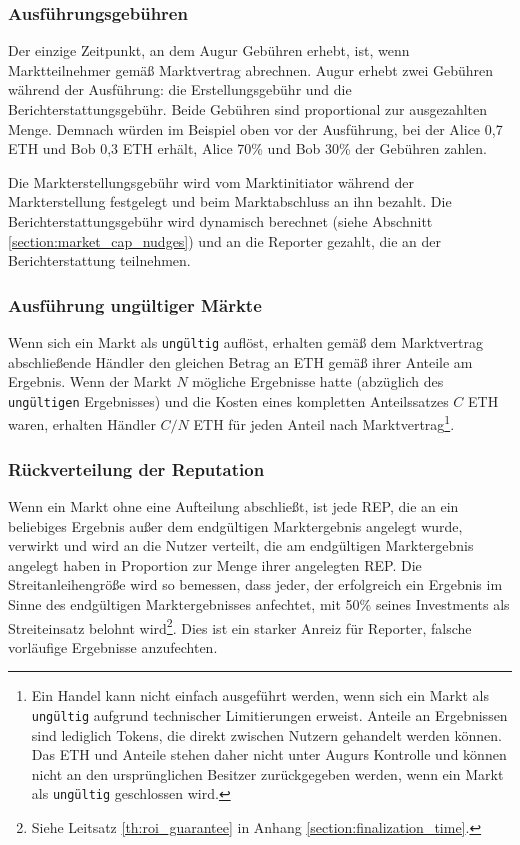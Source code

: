 \documentclass[floatfix,reprint,nofootinbib,amsmath,amssymb,epsfig,pre,floats,letterpaper,groupedaffiliation]{revtex4-1}
\theoremstyle{definition}
\theoremstyle{definition}
\theoremstyle{definition}
\begin{document}
\subsubsection{Ausführungsgebühren}

Der einzige Zeitpunkt, an dem Augur Gebühren erhebt, ist, wenn Marktteilnehmer gemäß Marktvertrag abrechnen. Augur erhebt zwei Gebühren während der Ausführung: die Erstellungsgebühr und die Berichterstattungsgebühr. Beide Gebühren sind proportional zur ausgezahlten Menge. Demnach würden im Beispiel oben vor der Ausführung, bei der Alice 0,7 ETH und Bob 0,3 ETH erhält, Alice 70\% und Bob 30\% der Gebühren zahlen.

Die Markterstellungsgebühr wird vom Marktinitiator während der Markterstellung festgelegt und beim Marktabschluss an ihn bezahlt. Die Berichterstattungsgebühr wird dynamisch berechnet (siehe Abschnitt \ref{section:market_cap_nudges}) und an die Reporter gezahlt, die an der Berichterstattung teilnehmen.

\subsubsection{Ausführung ungültiger Märkte}\label{section:settlement_of_invalid_markets}

Wenn sich ein Markt als \texttt{ungültig} auflöst, erhalten gemäß dem Marktvertrag abschließende Händler den gleichen Betrag an ETH gemäß ihrer Anteile am Ergebnis. Wenn der Markt $N$ mögliche Ergebnisse hatte (abzüglich des \texttt{ungültigen} Ergebnisses) und die Kosten eines kompletten Anteilssatzes $C$ ETH waren, erhalten Händler $C/N$ ETH für jeden Anteil nach Marktvertrag\footnote{Ein Handel kann nicht einfach ausgeführt werden, wenn sich ein Markt als \texttt{ungültig} aufgrund technischer Limitierungen erweist. Anteile an Ergebnissen sind lediglich Tokens, die direkt zwischen Nutzern gehandelt werden können. Das ETH und Anteile stehen daher nicht unter Augurs Kontrolle und können nicht an den ursprünglichen Besitzer zurückgegeben werden, wenn ein Markt als \texttt{ungültig} geschlossen wird.}.

\subsubsection{Rückverteilung der Reputation}\label{section:rep_redistribution}

Wenn ein Markt ohne eine Aufteilung abschließt, ist jede REP, die an ein beliebiges Ergebnis außer dem endgültigen Marktergebnis angelegt wurde, verwirkt und wird an die Nutzer verteilt, die am endgültigen Marktergebnis angelegt haben in Proportion zur Menge ihrer angelegten REP. Die Streitanleihengröße wird so bemessen, dass jeder, der erfolgreich ein Ergebnis im Sinne des endgültigen Marktergebnisses anfechtet, mit 50\% seines Investments als Streiteinsatz belohnt wird\footnote{Siehe Leitsatz \ref{th:roi_guarantee} in Anhang \ref{section:finalization_time}.}. Dies ist ein starker Anreiz für Reporter, falsche vorläufige Ergebnisse anzufechten.
\end{document}
